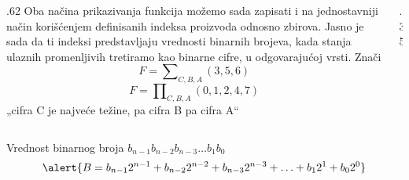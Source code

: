 \begin{frame}[label=02-s018]
\gusttekst
\begin{columns}[c,onlytextwidth]
\begin{column}{.62\textwidth}
Oba načina prikazivanja funkcija možemo sada zapisati i na jednostavniji način korišćenjem definisanih indeksa proizvoda odnosno zbirova. Jasno je sada da ti indeksi predstavljaju vrednosti binarnih brojeva, kada stanja ulaznih promenljivih tretiramo kao binarne cifre, u odgovarajućoj vrsti. Znači
\[
F=\sum\nolimits_{C,B,A}(3,5,6)
\]
\[
F=\prod\nolimits_{C,B,A}(0,1,2,4,7)
\]
„cifra C je najveće težine, pa cifra B pa cifra A“
\end{column}
\begin{column}{.35\textwidth}

\end{column}
\end{columns}
\centering
Vrednost binarnog broja \(b_{n-1}b_{n-2}b_{n-3}\ldots b_1b_0\)
\[
\alert{B=b_{n-1}2^{n-1}+b_{n-2}2^{n-2}+b_{n-3}2^{n-3}+\ldots+b_12^1+b_02^0}
\]
\end{frame}
